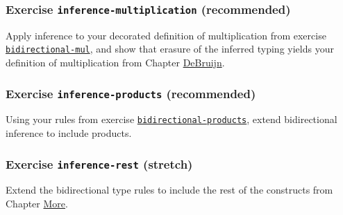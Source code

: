 \hypertarget{exercise-inference-multiplication-recommended}{%
\subsubsection{\texorpdfstring{Exercise
\texttt{inference-multiplication}
(recommended)}{Exercise inference-multiplication (recommended)}}\label{exercise-inference-multiplication-recommended}}

Apply inference to your decorated definition of multiplication from
exercise
\protect\hyperlink{Inference-bidirectional-mul}{\texttt{bidirectional-mul}},
and show that erasure of the inferred typing yields your definition of
multiplication from Chapter \protect\hyperlink{DeBruijn}{DeBruijn}.

\begin{fence}
\begin{code}%
\>[0]\<%
\end{code}
\end{fence}

\hypertarget{exercise-inference-products-recommended}{%
\subsubsection{\texorpdfstring{Exercise \texttt{inference-products}
(recommended)}{Exercise inference-products (recommended)}}\label{exercise-inference-products-recommended}}

Using your rules from exercise
\protect\hyperlink{Inference-bidirectional-products}{\texttt{bidirectional-products}},
extend bidirectional inference to include products.

\begin{fence}
\begin{code}%
\>[0]\<%
\end{code}
\end{fence}

\hypertarget{exercise-inference-rest-stretch}{%
\subsubsection{\texorpdfstring{Exercise \texttt{inference-rest}
(stretch)}{Exercise inference-rest (stretch)}}\label{exercise-inference-rest-stretch}}

Extend the bidirectional type rules to include the rest of the
constructs from Chapter \protect\hyperlink{More}{More}.

\begin{fence}
\begin{code}%
\>[0]\<%
\end{code}
\end{fence}

